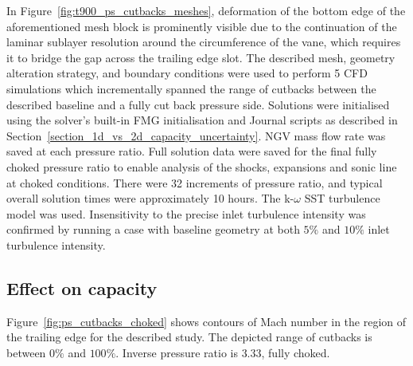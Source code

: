 \documentclass[a4paper, 11pt, oneside]{report}
\begin{document}
In Figure~\ref{fig:t900_ps_cutbacks_meshes}, deformation of the bottom edge of the aforementioned mesh block is prominently visible due to the continuation of the laminar sublayer resolution around the circumference of the vane, which requires it to bridge the gap across the trailing edge slot. The described mesh, geometry alteration strategy, and boundary conditions were used to perform 5 CFD simulations which incrementally spanned the range of cutbacks between the described baseline and a fully cut back pressure side. Solutions were initialised using the solver's built-in FMG initialisation and Journal scripts as described in Section~\ref{section_1d_vs_2d_capacity_uncertainty}. NGV mass flow rate was saved at each pressure ratio. Full solution data were saved for the final fully choked pressure ratio to enable analysis of the shocks, expansions and sonic line at choked conditions. There were 32 increments of pressure ratio, and typical overall solution times were approximately 10 hours. The k-$\omega$ SST turbulence model was used. Insensitivity to the precise inlet turbulence intensity was confirmed by running a case with baseline geometry at both $5\%$ and $10\%$ inlet turbulence intensity.

\subsection{Effect on capacity}

Figure~\ref{fig:ps_cutbacks_choked} shows contours of Mach number in the region of the trailing edge for the described study. The depicted range of cutbacks is between $0\%$ and $100\%$. Inverse pressure ratio is $3.33$, fully choked.
\end{document}
